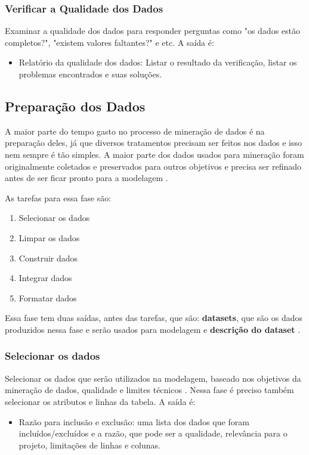 \subsubsection{Verificar a Qualidade dos Dados}
Examinar a qualidade dos dados para responder perguntas como "os dados estão completos?", "existem valores faltantes?" e etc.
A saída é: 
\begin{itemize}
    \item Relatório da qualidade dos dados: Listar o resultado da verificação, listar os problemas encontrados e suas soluções.
\end{itemize}
\subsection{Preparação dos Dados}
A maior parte do tempo gasto no processo de mineração de dados é na preparação deles, já que diversos tratamentos precisam ser feitos nos dados e isso nem sempre é tão simples. A maior parte dos dados usados para mineração foram originalmente coletados e preservados para outros objetivos e precisa ser refinado antes de ser ficar pronto para a modelagem \citep[82]{dmfd}.

As tarefas para essa fase são:
\begin{enumerate}
    \item Selecionar os dados
    \item Limpar os dados
    \item Construir dados
    \item Integrar dados
    \item Formatar dados
\end{enumerate}
Essa fase tem duas saídas, antes das tarefas, que são: \textbf{datasets}, que são os dados produzidos nessa fase e serão usados para modelagem e \textbf{descrição do dataset} \citep[21]{crispmanual}.
\subsubsection{Selecionar os dados}
Selecionar os dados que serão utilizados na modelagem, baseado nos objetivos da mineração de dados, qualidade e limites técnicos \citep[21]{crispmanual}.
Nessa fase é preciso também selecionar os atributos e linhas da tabela.
A saída é:
\begin{itemize}
    \item Razão para inclusão e exclusão: uma lista dos dados que foram incluídos/excluídos e a razão, que pode ser a qualidade, relevância para o projeto, limitações de linhas e colunas.
\end{itemize}

